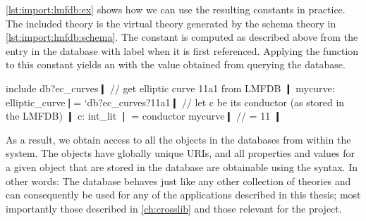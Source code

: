 \autoref{lst:import:lmfdb:ex} shows how we can use the resulting constants in practice. The included theory  is the virtual theory generated by the schema theory in \autoref{lst:import:lmfdb:schema}. The constant  is computed as described above from the entry in the database with label  when it is first referenced. Applying the  function to this constant yields an  with the value obtained from querying the database. 

\begin{mmtcode}[caption= {Using Virtual Theories\protect\footnotemark},label=lst:import:lmfdb:ex]
  include db?ec_curves❙
  // get elliptic curve 11a1 from LMFDB ❙
  mycurve: elliptic_curve❘= `db?ec_curves?11a1❙
  // let c be its conductor (as stored in the LMFDB) ❙
  c: int_lit ❘ = conductor mycurve❙ // = 11 ❙

\end{mmtcode}

As a result, we obtain access to all the objects in the databases from within the \mmt system. 
The objects have globally unique \mmt URIs, and all properties and values for a given object that are
stored in the database are obtainable using the \mmt syntax. In other words: The database behaves just like
any other collection of \mmt theories and can consequently be used for any of the applications described in this
thesis; most importantly those described in \autoref{ch:crosslib} and those relevant for the \ODK project.



